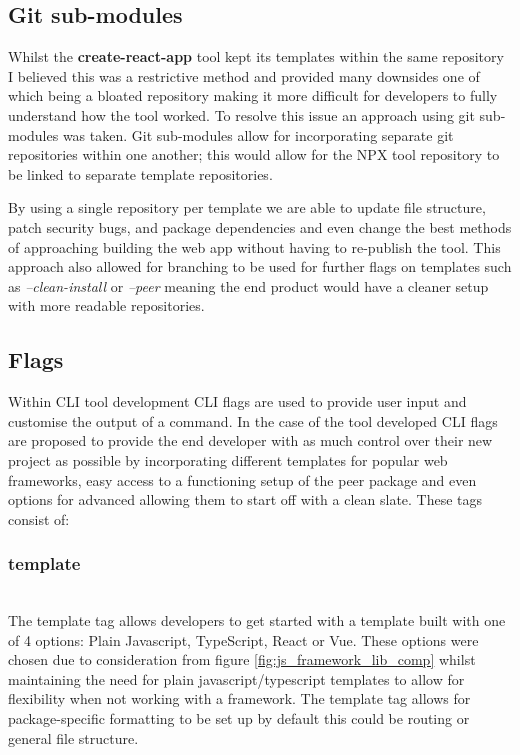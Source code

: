 \documentclass{l4proj}
\begin{document}
\subsection{Git sub-modules}
Whilst the \textbf{create-react-app} tool kept its templates within the same repository I believed this was a restrictive method and provided many downsides one of which being a bloated repository making it more difficult for developers to fully understand how the tool worked. To resolve this issue an approach using git sub-modules was taken. Git sub-modules allow for incorporating separate git repositories within one another; this would allow for the NPX tool repository to be linked to separate template repositories.

By using a single repository per template we are able to update file structure, patch security bugs, and package dependencies and even change the best methods of approaching building the web app without having to re-publish the tool. This approach also allowed for branching to be used for further flags on templates such as \textit{--clean-install} or \textit{--peer} meaning the end product would have a cleaner setup with more readable repositories.

\subsection{Flags}
Within CLI tool development CLI flags are used to provide user input and customise the output of a command. In the case of the tool developed CLI flags are proposed to provide the end developer with as much control over their new project as possible by incorporating different templates for popular web frameworks, easy access to a functioning setup of the peer package and even options for advanced allowing them to start off with a clean slate. These tags consist of:

\subsubsection{template}\hfill\\
The template tag allows developers to get started with a template built with one of 4 options: Plain Javascript, TypeScript, React or Vue. These options were chosen due to consideration from figure \ref{fig:js_framework_lib_comp} whilst maintaining the need for plain javascript/typescript templates to allow for flexibility when not working with a framework. The template tag allows for package-specific formatting to be set up by default this could be routing or general file structure.
\end{document}
